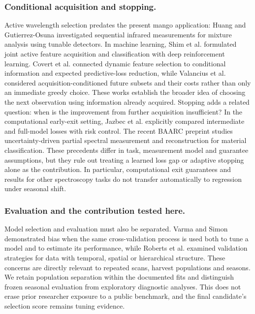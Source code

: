 \documentclass[Review,sagev,times]{sagej}
\begin{document}
\subsubsection{Conditional acquisition and stopping.}
Active wavelength selection predates the present mango application: Huang and Gutierrez-Osuna\citep{huang2015} investigated sequential infrared measurements for mixture analysis using tunable detectors. In machine learning, Shim et al.\citep{shim2018} formulated joint active feature acquisition and classification with deep reinforcement learning. Covert et al.\citep{covert2023} connected dynamic feature selection to conditional information and expected predictive-loss reduction, while Valancius et al.\citep{valancius2024} considered acquisition-conditioned future subsets and their costs rather than only an immediate greedy choice. These works establish the broader idea of choosing the next observation using information already acquired. Stopping adds a related question: when is the improvement from further acquisition insufficient? In the computational early-exit setting, Jazbec et al.\citep{jazbec2024} explicitly compared intermediate and full-model losses with risk control. The recent BAARC preprint studies uncertainty-driven partial spectral measurement and reconstruction for material classification.\citep{baarc2026} These precedents differ in task, measurement model and guarantee assumptions, but they rule out treating a learned loss gap or adaptive stopping alone as the contribution. In particular, computational exit guarantees and results for other spectroscopy tasks do not transfer automatically to regression under seasonal shift.

\subsubsection{Evaluation and the contribution tested here.}
Model selection and evaluation must also be separated. Varma and Simon\citep{varma2006} demonstrated bias when the same cross-validation process is used both to tune a model and to estimate its performance, while Roberts et al.\citep{roberts2017} examined validation strategies for data with temporal, spatial or hierarchical structure. These concerns are directly relevant to repeated scans, harvest populations and seasons. We retain population separation within the documented fits and distinguish frozen seasonal evaluation from exploratory diagnostic analyses. This does not erase prior researcher exposure to a public benchmark, and the final candidate's selection score remains tuning evidence.
\end{document}
